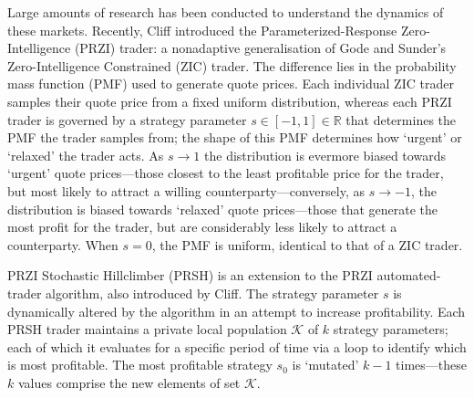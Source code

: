 \documentclass[conference]{IEEEtran}
\begin{document}
Large amounts of research has been conducted to understand the dynamics of these markets.
Recently, Cliff introduced the Parameterized-Response Zero-Intelligence (PRZI) \cite{PRZI} trader: a nonadaptive generalisation of Gode and Sunder's Zero-Intelligence Constrained (ZIC) \cite{GodeSunder} trader.
The difference lies in the probability mass function (PMF) used to generate quote prices.
Each individual ZIC trader samples their quote price from a fixed uniform distribution, whereas each PRZI trader is governed by a strategy parameter $s\in[-1, 1]\in\mathbb{R}$ that determines the PMF the trader samples from; the shape of this PMF determines how `urgent' or `relaxed' the trader acts.
As $s\to1$ the distribution is evermore biased towards `urgent' quote prices---those closest to the least profitable price for the trader, but most likely to attract a willing counterparty---conversely, as $s\to-1$, the distribution is biased towards `relaxed' quote prices---those that generate the most profit for the trader, but are considerably less likely to attract a counterparty.
When $s=0$, the PMF is uniform, identical to that of a ZIC trader.

PRZI Stochastic Hillclimber (PRSH) \cite{PRSH} is an extension to the PRZI automated-trader algorithm, also introduced by Cliff.
The strategy parameter $s$ is dynamically altered by the algorithm in an attempt to increase profitability.
Each PRSH trader maintains a private local population $\mathcal{K}$ of $k$ strategy parameters; each of which it evaluates for a specific period of time via a loop to identify which is most profitable.
The most profitable strategy $s_0$ is `mutated' $k-1$ times---these $k$ values comprise the new elements of set $\mathcal{K}$.
\end{document}
